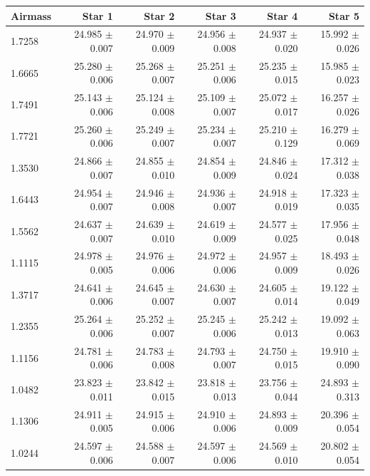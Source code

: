 \documentclass{tda}
\begin{document}
	\begin{table}
		\centering
		\begin{tabular} {l r r r r r}
			\toprule
			\textbf{Airmass} & \textbf{Star 1} & \textbf{Star 2} & \textbf{Star 3} & \textbf{Star 4} & \textbf{Star 5} \\
			\midrule
			1.7258 & 24.985 \(\pm\) 0.007 & 24.970 \(\pm\) 0.009 & 24.956 \(\pm\) 0.008 & 24.937 \(\pm\) 0.020 & 15.992 \(\pm\)  0.026 \\
			1.6665 & 25.280 \(\pm\) 0.006 & 25.268 \(\pm\) 0.007 & 25.251 \(\pm\) 0.006 & 25.235 \(\pm\) 0.015 & 15.985 \(\pm\)  0.023 \\
			1.7491 & 25.143 \(\pm\) 0.006 & 25.124 \(\pm\) 0.008 & 25.109 \(\pm\) 0.007 & 25.072 \(\pm\) 0.017 & 16.257 \(\pm\)  0.026 \\
			1.7721 & 25.260 \(\pm\) 0.006 & 25.249 \(\pm\) 0.007 & 25.234 \(\pm\) 0.007 & 25.210 \(\pm\) 0.129 & 16.279 \(\pm\)  0.069 \\
			1.3530 & 24.866 \(\pm\) 0.007 & 24.855 \(\pm\) 0.010 & 24.854 \(\pm\) 0.009 & 24.846 \(\pm\) 0.024 & 17.312 \(\pm\)  0.038 \\
			1.6443 & 24.954 \(\pm\) 0.007 & 24.946 \(\pm\) 0.008 & 24.936 \(\pm\) 0.007 & 24.918 \(\pm\) 0.019 & 17.323 \(\pm\)  0.035 \\
			1.5562 & 24.637 \(\pm\) 0.007 & 24.639 \(\pm\) 0.010 & 24.619 \(\pm\) 0.009 & 24.577 \(\pm\) 0.025 & 17.956 \(\pm\)  0.048 \\
			1.1115 & 24.978 \(\pm\) 0.005 & 24.976 \(\pm\) 0.006 & 24.972 \(\pm\) 0.006 & 24.957 \(\pm\) 0.009 & 18.493 \(\pm\)  0.026 \\
			1.3717 & 24.641 \(\pm\) 0.006 & 24.645 \(\pm\) 0.007 & 24.630 \(\pm\) 0.007 & 24.605 \(\pm\) 0.014 & 19.122 \(\pm\)  0.049 \\
			1.2355 & 25.264 \(\pm\) 0.006 & 25.252 \(\pm\) 0.007 & 25.245 \(\pm\) 0.006 & 25.242 \(\pm\) 0.013 & 19.092 \(\pm\)  0.063 \\
			1.1156 & 24.781 \(\pm\) 0.006 & 24.783 \(\pm\) 0.008 & 24.793 \(\pm\) 0.007 & 24.750 \(\pm\) 0.015 & 19.910 \(\pm\)  0.090 \\
			1.0482 & 23.823 \(\pm\) 0.011 & 23.842 \(\pm\) 0.015 & 23.818 \(\pm\) 0.013 & 23.756 \(\pm\) 0.044 & 24.893 \(\pm\)  0.313 \\
			1.1306 & 24.911 \(\pm\) 0.005 & 24.915 \(\pm\) 0.006 & 24.910 \(\pm\) 0.006 & 24.893 \(\pm\) 0.009 & 20.396 \(\pm\)  0.054 \\
			1.0244 & 24.597 \(\pm\) 0.006 & 24.588 \(\pm\) 0.007 & 24.597 \(\pm\) 0.006 & 24.569 \(\pm\) 0.010 & 20.802 \(\pm\)  0.054 \\

\end{tabular}
\end{table}
\end{document}
